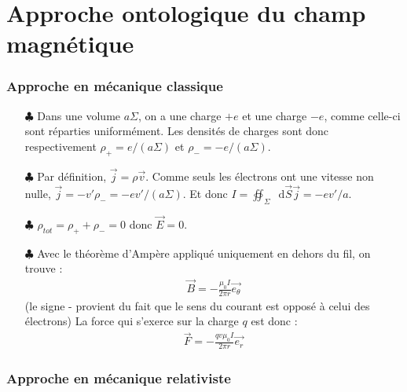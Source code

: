 \documentclass{report}
\newcommand*\dif{\mathop{}\!\mathrm{d}}
\begin{document}
\section*{Approche ontologique du champ magnétique}

\subsubsection*{Approche en mécanique classique}

\begin{itemize}
	\item[$\clubsuit$] Dans une volume $a\Sigma$, on a une charge $+e$ et une charge $-e$, comme celle-ci sont réparties uniformément. Les densités de charges sont donc respectivement $\rho_+=e/(a\Sigma)$ et $\rho_-=-e/(a\Sigma)$.
	\item[$\clubsuit$] Par définition, $\vec{j}=\rho\vec{v}$. Comme seuls les électrons ont une vitesse non nulle, $\vec{j}=-v'\rho_-=-ev'/(a\Sigma)$. Et donc $I=\oiint_\Sigma\dif\vec{S}\vec{j}=-ev'/a$.
	\item[$\clubsuit$] $\rho_{tot}=\rho_++\rho_-=0$ donc $\vec{E}=0$.
	\item[$\clubsuit$] Avec le théorème d'Ampère appliqué uniquement en dehors du fil, on trouve :
	\begin{align*}
		\vec{B}=-\frac{\mu_0I}{2\pi r}\vec{e_\theta}
	\end{align*}
	(le signe - provient du fait que le sens du courant est opposé à celui des électrons)
	La force qui s'exerce sur la charge $q$ est donc :
	\begin{align*}
		\vec{F}=-\frac{qv\mu_0I}{2\pi r}\vec{e_r}
	\end{align*}
\end{itemize}

\subsubsection*{Approche en mécanique relativiste}
\end{document}
